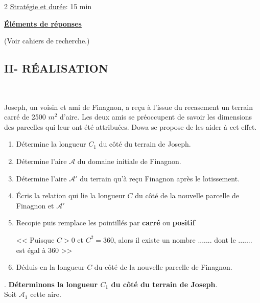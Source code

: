 \begin{multicols*}{2}
  	\underline{Stratégie et durée}: 15 min
  	\begin{center}
  		\underline{\textbf{Éléments de réponses}}
  	\end{center}
  	(Voir cahiers de recherche.)
  	
  	\begin{center}
  		\section*{II- RÉALISATION}
  	\end{center}
  	\\
  	
  	
  	\hspace{0.5cm} Joseph, un voisin et ami de Finagnon, a reçu à l'issue du recasement un terrain carré de 2500 $m^{2}$ d'aire. Les deux amis se préoccupent de savoir les dimensions des parcelles qui leur ont été attribuées. Dowa se propose de les aider à cet effet. 
  	
  	\begin{enumerate}
  		\item Détermine la longueur $C_{1}$ du côté du terrain de Joseph.
  		\item Détermine l'aire $\mathcal{A}$ du domaine initiale de Finagnon.
  		\item Détermine l'aire $\mathcal{A'}$ du terrain qu'à reçu  Finagnon après le lotissement.
  		\item Écris la relation qui lie la longueur $C$ du côté de la nouvelle parcelle de Finagnon et $\mathcal{A'}$ 
  		\item Recopie puis remplace les pointillés par \textbf{carré} ou \textbf{positif}
  		
  		<< Puisque $C>0$ et $C^2=360 $, alors il existe un nombre ....... dont le ....... est égal à 360 >>
  		
  		\item Déduis-en la longueur $C$ du côté de la nouvelle parcelle de Finagnon. 
  	\end{enumerate} 
  	\dure
  	.  \textbf{Déterminons la longueur $C_{1}$ du côté du terrain de Joseph}.\\ 
  	Soit $\mathcal{A}_{1}$ cette aire.
  	

\end{multicols*}
